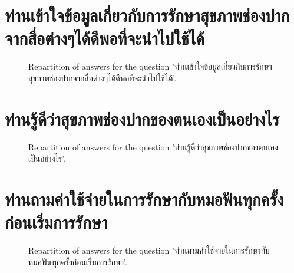 \documentclass[12pt]{article}
\begin{document}
\clearpage{}
\section{ท่านเข้าใจข้อมูลเกี่ยวกับการรักษาสุขภาพช่องปากจากสื่อต่างๆได้ดีพอที่จะนำไปใช้ได้}

\label{sec:105}


\begin{figure}[h!]
    \caption{\label{figure:q105-1}Repartition of answers for the question 'ท่านเข้าใจข้อมูลเกี่ยวกับการรักษาสุขภาพช่องปากจากสื่อต่างๆได้ดีพอที่จะนำไปใช้ได้'.}
\end{figure}



\clearpage{}
\section{ท่านรู้ดีว่าสุขภาพช่องปากของตนเองเป็นอย่างไร}

\label{sec:106}


\begin{figure}[h!]
    \caption{\label{figure:q106-1}Repartition of answers for the question 'ท่านรู้ดีว่าสุขภาพช่องปากของตนเองเป็นอย่างไร'.}
\end{figure}



\clearpage{}
\section{ท่านถามค่าใช้จ่ายในการรักษากับหมอฟันทุกครั้งก่อนเริ่มการรักษา}

\label{sec:107}


\begin{figure}[h!]
    \caption{\label{figure:q107-1}Repartition of answers for the question 'ท่านถามค่าใช้จ่ายในการรักษากับหมอฟันทุกครั้งก่อนเริ่มการรักษา'.}
\end{figure}
\end{document}
